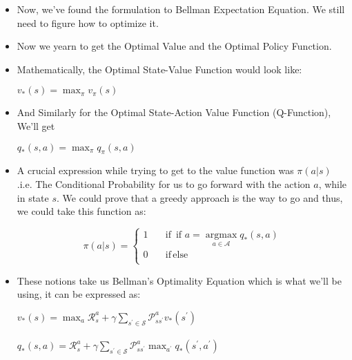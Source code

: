 \documentclass{article}
\begin{document}
\begin{itemize}
  \item Now, we've found the formulation to Bellman Expectation Equation. We still need to figure how to optimize it.
  \item Now we yearn to get the Optimal Value and the Optimal Policy Function.
  \item Mathematically, the Optimal State-Value Function would look like:  \\
    \begin{center}
      \( v_{*}(s)=\max _{\pi} v_{\pi}(s) \)
    \end{center}
  \item And Similarly for the Optimal State-Action Value Function (Q-Function), We'll get \\
  \begin{center}
    \( q_{*}(s, a)=\max _{\pi} q_{\pi}(s, a) \)
  \end{center}
  \item A crucial expression while trying to get to the value function was $\pi (a|s)$ .i.e. The Conditional Probability for us to go forward with the action $a$, while in state $s$. We could prove that a greedy approach is the way to go and thus, we could take this function as:  \\
  \begin{center}
  \begin{equation*}
      \pi (a|s)=\begin{cases}
         1  \quad &\text{if} \, \text { if } a=\underset{a \in \mathcal{A}}{\operatorname{argmax}} q_{*}(s, a) \\
         0 \quad &\text{if} \, \text{else} \\
   \end{cases}
\end{equation*}
  \end{center}

  \item These notions take us Bellman's Optimality Equation which is what we'll be using, it can be expressed as: \\

  \begin{center}
    \( v_{*}(s)=\max _{a} \mathcal{R}_{s}^{a}+\gamma \sum_{s^{\prime} \in \mathcal{S}} \mathcal{P}_{s s^{\prime}}^{a} v_{*}\left(s^{\prime}\right) \) \\~\\
    \( q_{*}(s, a)=\mathcal{R}_{s}^{a}+\gamma \sum_{s^{\prime} \in \mathcal{S}} \mathcal{P}_{s s^{\prime}}^{a} \max _{a^{\prime}} q_{*}\left(s^{\prime}, a^{\prime}\right) \)
  \end{center}

\end{itemize}
\end{document}

